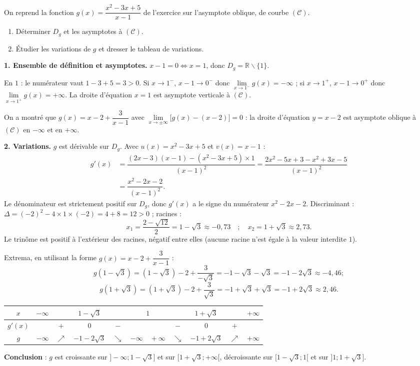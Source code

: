 \documentclass[11pt]{article}
\def\setminus{\mathbin{\backslash}}\let\smallsetminus\setminus
\begin{document}
\begin{exoresolu}[Étude de $g(x)=\dfrac{x^2-3x+5}{x-1}$]
On reprend la fonction $g(x)=\dfrac{x^2-3x+5}{x-1}$ de l'exercice sur l'asymptote oblique, de courbe $(\mathcal{C})$.
\begin{enumerate}
\item Déterminer $D_g$ et les asymptotes à $(\mathcal{C})$.
\item Étudier les variations de $g$ et dresser le tableau de variations.
\end{enumerate}
\tcblower
\textbf{1. Ensemble de définition et asymptotes.} $x-1=0\iff x=1$, donc $D_g=\mathbb{R}\setminus\{1\}$.

En $1$ : le numérateur vaut $1-3+5=3>0$. Si $x\to 1^-$, $x-1\to 0^-$ donc $\lim\limits_{x\to 1^-}g(x)=-\infty$ ; si $x\to 1^+$, $x-1\to 0^+$ donc $\lim\limits_{x\to 1^+}g(x)=+\infty$. La droite d'équation $x=1$ est asymptote verticale à $(\mathcal{C})$.

On a montré que $g(x)=x-2+\dfrac{3}{x-1}$ avec $\lim\limits_{x\to\pm\infty}\big[g(x)-(x-2)\big]=0$ : la droite d'équation $y=x-2$ est asymptote oblique à $(\mathcal{C})$ en $-\infty$ et en $+\infty$.

\textbf{2. Variations.} $g$ est dérivable sur $D_g$. Avec $u(x)=x^2-3x+5$ et $v(x)=x-1$ :
\begin{align*}
g'(x)&=\dfrac{(2x-3)(x-1)-(x^2-3x+5)\times 1}{(x-1)^2}=\dfrac{2x^2-5x+3-x^2+3x-5}{(x-1)^2}\\
&=\dfrac{x^2-2x-2}{(x-1)^2}.
\end{align*}
Le dénominateur est strictement positif sur $D_g$, donc $g'(x)$ a le signe du numérateur $x^2-2x-2$. Discriminant : $\Delta=(-2)^2-4\times 1\times(-2)=4+8=12>0$ ; racines :
\[x_1=\dfrac{2-\sqrt{12}}{2}=1-\sqrt{3}\approx -0{,}73 \quad ; \quad x_2=1+\sqrt{3}\approx 2{,}73.\]
Le trinôme est positif à l'extérieur des racines, négatif entre elles (aucune racine n'est égale à la valeur interdite $1$).

Extrema, en utilisant la forme $g(x)=x-2+\dfrac{3}{x-1}$ :
\[g(1-\sqrt{3})=(1-\sqrt{3})-2+\dfrac{3}{-\sqrt{3}}=-1-\sqrt{3}-\sqrt{3}=-1-2\sqrt{3}\approx -4{,}46 ;\]
\[g(1+\sqrt{3})=(1+\sqrt{3})-2+\dfrac{3}{\sqrt{3}}=-1+\sqrt{3}+\sqrt{3}=-1+2\sqrt{3}\approx 2{,}46.\]

\begin{center}
\begin{tabular}{|c|ccc||cccccc|}\hline
$x$ & $-\infty$ & & $1-\sqrt{3}$ & & $1$ & & $1+\sqrt{3}$ & & $+\infty$ \\ \hline
$g'(x)$ & & $+$ & $0$ & $-$ & & $-$ & $0$ & $+$ & \\ \hline
$g$ & $-\infty$ & $\nearrow$ & $-1-2\sqrt{3}$ & $\searrow$ & $-\infty\quad+\infty$ & $\searrow$ & $-1+2\sqrt{3}$ & $\nearrow$ & $+\infty$ \\ \hline
\end{tabular}
\end{center}

\textbf{Conclusion} : $g$ est croissante sur $]-\infty;1-\sqrt{3}]$ et sur $[1+\sqrt{3};+\infty[$, décroissante sur $[1-\sqrt{3};1[$ et sur $]1;1+\sqrt{3}]$.
\end{exoresolu}
\end{document}
